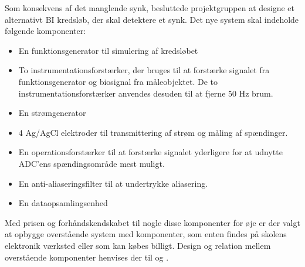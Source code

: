 Som konsekvens af det manglende synk, besluttede projektgruppen at designe et alternativt BI kredsløb, der skal detektere et synk. Det nye system skal indeholde følgende komponenter:

\begin{itemize}
\item En funktionsgenerator til simulering af kredsløbet
\item To instrumentationsforstærker, der bruges til at forstærke signalet fra funktionsgenerator og biosignal fra måleobjektet. De to  instrumentationsforstærker anvendes desuden til at fjerne 50 Hz brum. 
\item En strømgenerator 
\item 4 Ag/AgCl elektroder til transmittering af strøm og måling af spændinger.
\item En operationsforstærker til at forstærke signalet yderligere for at udnytte ADC'ens spændingsområde mest muligt.

\item En anti-aliaseringsfilter til at undertrykke aliasering. 
\item En dataopsamlingsenhed

\end{itemize}


 

Med prisen og forhåndskendskabet til nogle disse komponenter for øje er der valgt at opbygge overstående system  med komponenter, som enten findes på skolens elektronik værksted eller som kan købes billigt. Design og relation mellem overstående komponenter henvises der til  og . 